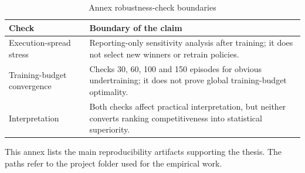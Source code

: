 \documentclass[12pt]{article}
\begin{document}
\begin{table}[H]
\centering
\caption{Annex robustness-check boundaries}
\scriptsize
\begin{tabularx}{\textwidth}{L{0.30\textwidth}Y}
\toprule
\textbf{Check} & \textbf{Boundary of the claim} \\
\midrule
Execution-spread stress & Reporting-only sensitivity analysis after training; it does not select new winners or retrain policies. \\
Training-budget convergence & Checks 30, 60, 100 and 150 episodes for obvious undertraining; it does not prove global training-budget optimality. \\
Interpretation & Both checks affect practical interpretation, but neither converts ranking competitiveness into statistical superiority. \\
\bottomrule
\end{tabularx}
\end{table}


This annex lists the main reproducibility artifacts supporting the thesis. The paths refer to the project folder used for the empirical work.
\end{document}
